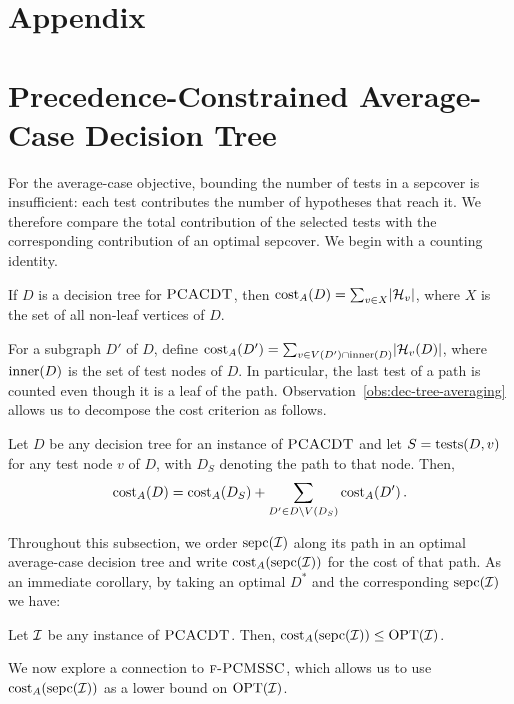 \appendix
\section*{Appendix}

\section{Precedence-Constrained Average-Case Decision Tree} \label{section:PCACDT}

For the average-case objective, bounding the number of tests in a sepcover is insufficient: each test contributes the number of hypotheses that reach it. We therefore compare the total contribution of the selected tests with the corresponding contribution of an optimal sepcover.
We begin with a counting identity.
\begin{observation} \label{obs:dec-tree-averaging}
    If $D$ is a decision tree for $\textup{\textsc{PCACDT}}$, then $\operatorname{cost}_A\mathopen{}\left( D \right)=\sum_{v\in X}\mathopen{}\left| \mathcal{H}_v \right|$, where $X$ is the set of all non-leaf vertices of $D$.
\end{observation}
For a subgraph $D'$ of $D$, define $\operatorname{cost}_A\mathopen{}\left( D' \right)=\sum_{v\in V(D')\cap\operatorname{inner}(D)}\mathopen{}\left| \mathcal{H}_v(D) \right|$, where $\operatorname{inner}(D)$ is the set of test nodes of $D$. In particular, the last test of a path is counted even though it is a leaf of the path.
Observation~\ref{obs:dec-tree-averaging} allows us to decompose the cost criterion as follows.
\begin{observation} \label{obs:WCdecomposition}
    Let $D$ be any decision tree for an instance of $\textup{\textsc{PCACDT}}$ and let $S=\operatorname{tests}(D,v)$ for any test node $v$ of $D$, with $D_S$ denoting the path to that node.
    Then,
    \[
    \operatorname{cost}_A\mathopen{}\left( D \right) = \operatorname{cost}_A\mathopen{}\left( D_{S} \right) + \sum_{D'\in D\setminus V\mathopen{}\left( D_{S} \right)} \operatorname{cost}_A\mathopen{}\left( D' \right).
    \]

\end{observation}
Throughout this subsection, we order $\operatorname{sepc}\mathopen{}\left( \mathcal{I} \right)$ along its path in an optimal average-case decision tree and write $\operatorname{cost}_A\mathopen{}\left( \operatorname{sepc}\mathopen{}\left( \mathcal{I} \right) \right)$ for the cost of that path.
As an immediate corollary, by taking an optimal $D^*$ and the corresponding $\operatorname{sepc}\mathopen{}\left( \mathcal{I} \right)$ we have:
\begin{observation} \label{obs:sepcoverAC}
    Let $\mathcal{I}$ be any instance of $\textup{\textsc{PCACDT}}$.
    Then, $\operatorname{cost}_A\mathopen{}\left( \operatorname{sepc}\mathopen{}\left( \mathcal{I} \right) \right) \leq \textup{\text{OPT}}\mathopen{}\left( \mathcal{I} \right)$.
\end{observation}
We now explore a connection to $\textup{\textsc{f-PCMSSC}}$, which allows us to use $\operatorname{cost}_A\mathopen{}\left( \operatorname{sepc}\mathopen{}\left( \mathcal{I} \right) \right)$ as a lower bound on $\textup{\text{OPT}}\mathopen{}\left( \mathcal{I} \right)$.
